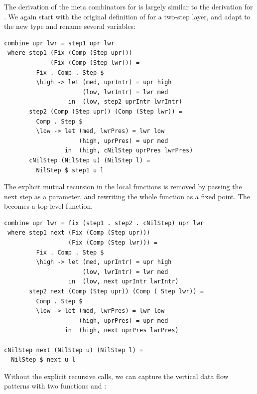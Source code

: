 \documentclass[preprint,natbib]{sigplanconf}
\begin{document}
The derivation of the meta combinators for  is largely similar to the derivation for . We again start with the original definition of  for a two-step layer, and adapt to the new  type and rename several variables:

\begin{small} %
\begin{verbatim}
combine upr lwr = step1 upr lwr
 where step1 (Fix (Comp (Step upr))) 
             (Fix (Comp (Step lwr))) = 
         Fix . Comp . Step $ 
         \high -> let (med, uprIntr) = upr high
                      (low, lwrIntr) = lwr med
                  in  (low, step2 uprIntr lwrIntr)
       step2 (Comp (Step upr)) (Comp (Step lwr)) = 
         Comp . Step $
         \low -> let (med, lwrPres) = lwr low
                     (high, uprPres) = upr med
                 in  (high, cNilStep uprPres lwrPres)
       cNilStep (NilStep u) (NilStep l) = 
         NilStep $ step1 u l 
\end{verbatim}%
\end{small}

The explicit mutual recursion in the local functions is removed by passing the next step as a parameter, and rewriting the whole function as a fixed point. The  becomes a top-level function.

\begin{small} %
\begin{verbatim}
combine upr lwr = fix (step1 . step2 . cNilStep) upr lwr
 where step1 next (Fix (Comp (Step upr))) 
                  (Fix (Comp (Step lwr))) = 
         Fix . Comp . Step $ 
         \high -> let (med, uprIntr) = upr high
                      (low, lwrIntr) = lwr med
                  in  (low, next uprIntr lwrIntr)
       step2 next (Comp (Step upr)) (Comp ( Step lwr)) = 
         Comp . Step $
         \low -> let (med, lwrPres) = lwr low
                     (high, uprPres) = upr med
                 in  (high, next uprPres lwrPres)

cNilStep next (NilStep u) (NilStep l) = 
  NilStep $ next u l
\end{verbatim}%
\end{small}

Without the explicit recursive calls, we can capture the vertical data flow patterns with two functions  and :
\end{document}
